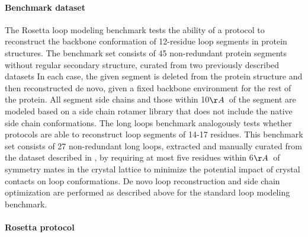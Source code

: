 \paragraph{Benchmark dataset}
The Rosetta loop modeling benchmark \cite{mandell_sub-angstrom_2009,tonikian_specificity_2008,ernst_rapid_2009,smith_predicting_2011,smith_structure-based_2010,stein_improvements_2013} tests the ability of a protocol to reconstruct the backbone conformation of 12-residue loop segments in protein structures. The benchmark set consists of 45 non-redundant protein segments without regular secondary structure, curated from two previously described datasets \cite{sellers_toward_2008,wang_proteinprotein_2007,fiser_modeling_2000,rohl_modeling_2004,zhu_long_2006,jacobson_hierarchical_2004}
In each case, the given segment is deleted from the protein structure and then reconstructed de novo, given a fixed backbone environment for the rest of the protein. All segment side chains and those within 10$\AA$\ of the segment are modeled based on a side chain rotamer library \cite{shapovalov_smoothed_2011} that does not include the native side chain conformations.
The long loops benchmark \cite{stein_improvements_2013} analogously tests whether protocols are able to reconstruct loop segments of 14-17 residues. This benchmark set consists of 27 non-redundant long loops, extracted and manually curated from the dataset described in \cite{zhao_progress_2011}, by requiring at most five residues within 6$\AA$\ of symmetry mates in the crystal lattice to minimize the potential impact of crystal contacts on loop conformations. De novo loop reconstruction and side chain optimization are performed as described above for the standard loop modeling benchmark.

\paragraph{Rosetta protocol}

